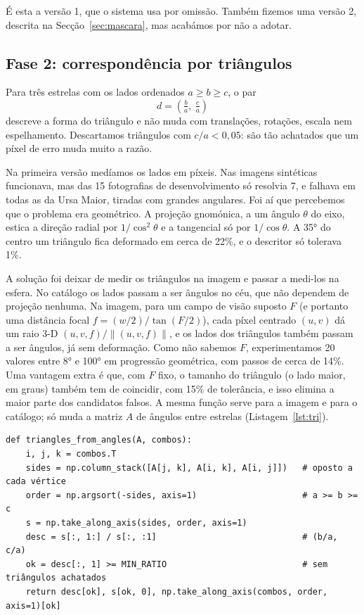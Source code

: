 \documentclass[11pt,a4paper]{article}
\begin{document}
É esta a versão 1, que o sistema usa por omissão. Também fizemos uma versão
2, descrita na Secção~\ref{sec:mascara}, mas acabámos por não a adotar.

\subsection{Fase 2: correspondência por triângulos}

Para três estrelas com os lados ordenados $a \ge b \ge c$, o par
\begin{equation}
  d = \left(\tfrac{b}{a},\ \tfrac{c}{a}\right)
\end{equation}
descreve a forma do triângulo e não muda com translações, rotações, escala nem
espelhamento. Descartamos triângulos com $c/a < 0{,}05$: são tão achatados que
um píxel de erro muda muito a razão.

Na primeira versão medíamos os lados em píxeis. Nas imagens sintéticas
funcionava, mas das 15 fotografias de desenvolvimento só resolvia 7, e
falhava em todas as da Ursa Maior, tiradas com grandes angulares. Foi aí que
percebemos que o problema era geométrico. A projeção gnomónica, a um ângulo
$\theta$ do eixo, estica a direção radial por $1/\cos^2\theta$ e a
tangencial só por $1/\cos\theta$. A 35° do centro um triângulo fica
deformado em cerca de 22\%, e o descritor só tolerava 1\%.

A solução foi deixar de medir os triângulos na imagem e passar a medi-los na
esfera. No catálogo os lados passam a ser ângulos no céu, que não dependem de
projeção nenhuma. Na imagem, para um campo de visão suposto $F$ (e portanto
uma distância focal $f = (w/2)/\tan(F/2)$), cada píxel centrado $(u,v)$ dá um
raio 3-D $(u, v, f)/\|(u,v,f)\|$, e os lados dos triângulos também passam a
ser ângulos, já sem deformação. Como não sabemos $F$, experimentamos 20
valores entre 8° e 100° em progressão geométrica, com passos de cerca de
14\%. Uma vantagem extra é que, com $F$ fixo, o tamanho do triângulo (o lado
maior, em graus) também tem de coincidir, com 15\% de tolerância, e isso
elimina a maior parte dos candidatos falsos. A mesma função serve para a
imagem e para o catálogo; só muda a matriz $A$ de ângulos entre estrelas
(Listagem~\ref{lst:tri}).

\begin{lstlisting}[caption={Descritores de muitos triângulos de uma vez (\texttt{src/matching\_sphere.py}).},label=lst:tri]
def triangles_from_angles(A, combos):
    i, j, k = combos.T
    sides = np.column_stack([A[j, k], A[i, k], A[i, j]])   # oposto a cada vértice
    order = np.argsort(-sides, axis=1)                     # a >= b >= c
    s = np.take_along_axis(sides, order, axis=1)
    desc = s[:, 1:] / s[:, :1]                             # (b/a, c/a)
    ok = desc[:, 1] >= MIN_RATIO                           # sem triângulos achatados
    return desc[ok], s[ok, 0], np.take_along_axis(combos, order, axis=1)[ok]
\end{lstlisting}
\end{document}
